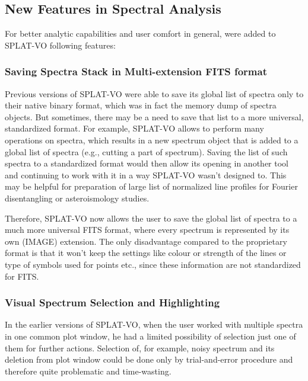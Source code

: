 \documentclass[final,authoryear,5p,times,twocolumn]{elsarticle}
\begin{document}
\subsection{New Features in Spectral Analysis}

\label{davids_functions}
For better analytic capabilities and user comfort in
general, were added \citep{and146bcthesis} to SPLAT-VO following features:

\subsubsection{Saving Spectra Stack in Multi-extension FITS format}

Previous versions of SPLAT-VO were able to save its global list of spectra only to
their native binary format, which was in fact the memory dump of spectra
objects. But sometimes, there may be a need to save that list to a more
universal, standardized format. For example, SPLAT-VO allows to perform many
operations on spectra, which results in a new spectrum object that is added to
a global list of spectra (e.g., cutting a part of spectrum). Saving the list of
such spectra to a standardized format would then allow its opening in another
tool and continuing to work with it in a way SPLAT-VO wasn't designed to.
This may be helpful for preparation of large list of normalized line profiles
for Fourier disentangling or asteroismology studies.

Therefore, SPLAT-VO now allows the user to save the global list of spectra to a
much more universal FITS format, where every spectrum  is represented by its
own (IMAGE) extension.  The only disadvantage compared to the proprietary
format is that it won't keep the settings like colour or strength of the lines
or type of symbols used for points etc., since these information  are not
standardized for FITS.


\subsubsection{Visual Spectrum Selection and Highlighting}

In the earlier versions of SPLAT-VO, when the user worked with multiple
spectra in one common plot window, he  had a limited possibility of
selection just one of them for further actions. Selection of, for example, noisy
spectrum and its deletion from plot window could be done only by
trial-and-error procedure and therefore quite problematic and time-wasting.
\end{document}
